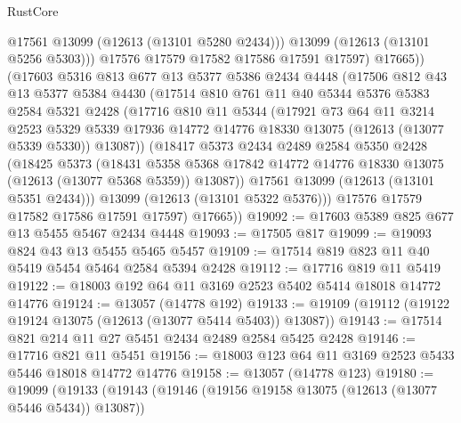 \begin{lexlean}{RustCore}
\begin{coremodule}
                @17561
                @13099
                (@12613 (@13101 @5280 @2434)))
              @13099
              (@12613 (@13101 @5256 @5303)))
            @17576
            @17579
            @17582
            @17586
            @17591
            @17597)
          @17665))
      (@17603
        @5316
        @813
        @677
        @13
        @5377
        @5386
        @2434
        @4448
        (@17506
          @812
          @43
          @13
          @5377
          @5384
          @4430
          (@17514
            @810
            @761
            @11
            @40
            @5344
            @5376
            @5383
            @2584
            @5321
            @2428
            (@17716
              @810
              @11
              @5344
              (@17921
                @73
                @64
                @11
                @3214
                @2523
                @5329
                @5339
                @17936
                @14772
                @14776
                @18330
                @13075
                (@12613 (@13077 @5339 @5330))
                @13087))
            (@18417
              @5373
              @2434
              @2489
              @2584
              @5350
              @2428
              (@18425
                @5373
                (@18431
                  @5358
                  @5368
                  @17842
                  @14772
                  @14776
                  @18330
                  @13075
                  (@12613 (@13077 @5368 @5359))
                  @13087))
              @17561
              @13099
              (@12613 (@13101 @5351 @2434)))
            @13099
            (@12613 (@13101 @5322 @5376)))
          @17576
          @17579
          @17582
          @17586
          @17591
          @17597)
        @17665))
@19092 := @17603 @5389 @825 @677 @13 @5455 @5467 @2434 @4448
@19093 := @17505 @817
@19099 := @19093 @824 @43 @13 @5455 @5465 @5457
@19109 := @17514 @819 @823 @11 @40 @5419 @5454 @5464 @2584 @5394 @2428
@19112 := @17716 @819 @11 @5419
@19122 := @18003 @192 @64 @11 @3169 @2523 @5402 @5414 @18018 @14772 @14776
@19124 := @13057 (@14778 @192)
@19133 := @19109 (@19112 (@19122 @19124 @13075 (@12613 (@13077 @5414 @5403)) @13087))
@19143 := @17514 @821 @214 @11 @27 @5451 @2434 @2489 @2584 @5425 @2428
@19146 := @17716 @821 @11 @5451
@19156 := @18003 @123 @64 @11 @3169 @2523 @5433 @5446 @18018 @14772 @14776
@19158 := @13057 (@14778 @123)
@19180 := @19099
    (@19133
      (@19143
        (@19146 (@19156 @19158 @13075 (@12613 (@13077 @5446 @5434)) @13087))

\end{coremodule}
\end{lexlean}
